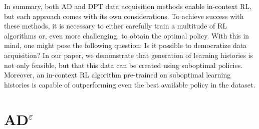 \documentclass{article}
\theoremstyle{plain}
\theoremstyle{definition}
\theoremstyle{remark}
\begin{document}
In summary, both AD and DPT data acquisition methods enable in-context RL, but each approach comes with its own considerations. To achieve success with these methods, it is necessary to either carefully train a multitude of RL algorithms or, even more challenging, to obtain the optimal policy. With this in mind, one might pose the following question: Is it possible to democratize data acquisition? In our paper, we demonstrate that generation of learning histories is not only feasible, but that this data can be created using suboptimal policies. Moreover, an in-context RL algorithm pre-trained on suboptimal learning histories is capable of outperforming even the best available policy in the dataset. 

\section{AD$^\varepsilon$}
\label{sec:ad_eps}

\end{document}
